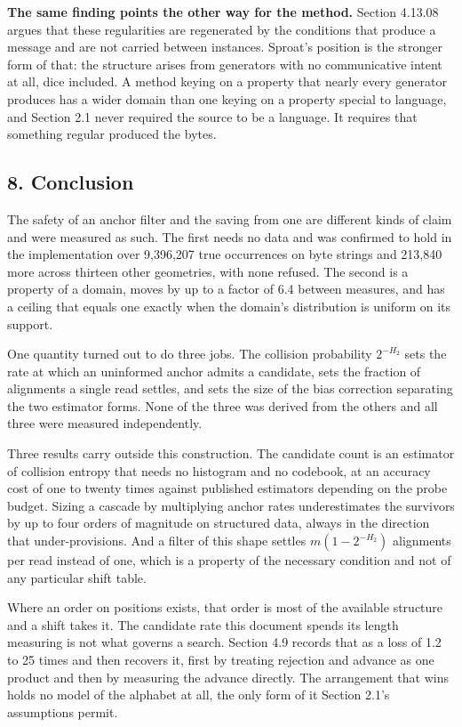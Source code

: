 \textbf{The same finding points the other way for the method.} Section 4.13.08 argues that these regularities are regenerated by the conditions that produce a message and are not carried between instances. Sproat's position is the stronger form of that: the structure arises from generators with no communicative intent at all, dice included. A method keying on a property that nearly every generator produces has a wider domain than one keying on a property special to language, and Section 2.1 never required the source to be a language. It requires that something regular produced the bytes.

\subsection{8. Conclusion}

The safety of an anchor filter and the saving from one are different kinds of claim and were measured as such. The first needs no data and was confirmed to hold in the implementation over 9,396,207 true occurrences on byte strings and 213,840 more across thirteen other geometries, with none refused. The second is a property of a domain, moves by up to a factor of 6.4 between measures, and has a ceiling that equals one exactly when the domain's distribution is uniform on its support.

One quantity turned out to do three jobs. The collision probability \(2^{-H_2}\) sets the rate at which an uninformed anchor admits a candidate, sets the fraction of alignments a single read settles, and sets the size of the bias correction separating the two estimator forms. None of the three was derived from the others and all three were measured independently.

Three results carry outside this construction. The candidate count is an estimator of collision entropy that needs no histogram and no codebook, at an accuracy cost of one to twenty times against published estimators depending on the probe budget. Sizing a cascade by multiplying anchor rates underestimates the survivors by up to four orders of magnitude on structured data, always in the direction that under-provisions. And a filter of this shape settles \(m(1-2^{-H_2})\) alignments per read instead of one, which is a property of the necessary condition and not of any particular shift table.

Where an order on positions exists, that order is most of the available structure and a shift takes it. The candidate rate this document spends its length measuring is not what governs a search. Section 4.9 records that as a loss of 1.2 to 25 times and then recovers it, first by treating rejection and advance as one product and then by measuring the advance directly. The arrangement that wins holds no model of the alphabet at all, the only form of it Section 2.1's assumptions permit.

